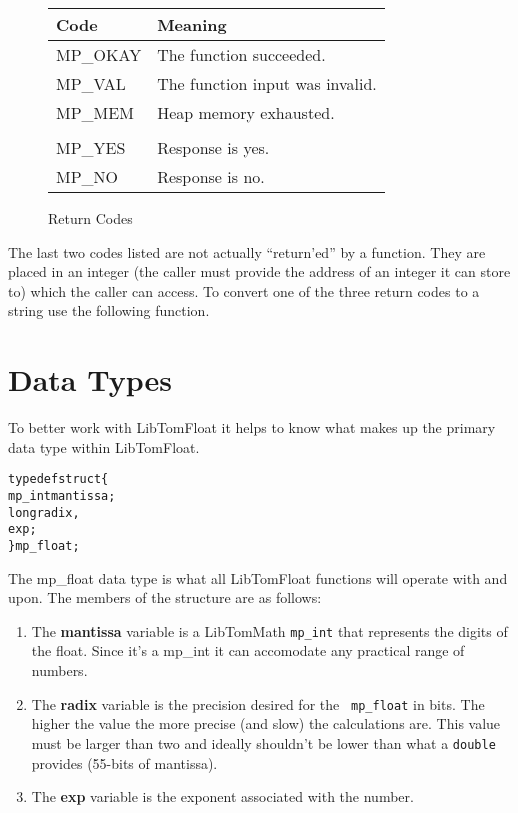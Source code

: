 \documentclass[a4paper]{book}
\theoremstyle{definition}
\theoremstyle{remark}
\begin{document}
\begin{figure}[here!]
\begin{center}
\begin{small}
\begin{tabular}{|l|l|}
\hline \textbf{Code} & \textbf{Meaning} \\
\hline MP\_OKAY & The function succeeded. \\
\hline MP\_VAL  & The function input was invalid. \\
\hline MP\_MEM  & Heap memory exhausted. \\
\hline &\\
\hline MP\_YES  & Response is yes. \\
\hline MP\_NO   & Response is no. \\
\hline
\end{tabular}
\end{small}
\end{center}
\caption{Return Codes}
\end{figure}

The last two codes listed are not actually ``return'ed'' by a function.  They are placed in an integer (the caller must provide the address of an integer it can store to) which the caller can access.  To convert one of the three return codes to a string use the following function.

\section{Data Types}

To better work with LibTomFloat it helps to know what makes up the primary data type within LibTomFloat.

\begin{alltt}
typedef struct \{
     mp_int mantissa;
     long   radix,
            exp;
\} mp_float;
\end{alltt}

The mp\_float data type is what all LibTomFloat functions will operate with and upon.  The members of the structure are as follows:

\begin{enumerate}
   \item The \textbf{mantissa} variable is a LibTomMath {\texttt{mp\_int}} that represents the digits of the float. Since it's a mp\_int it can accomodate any practical range of numbers.
   \item The \textbf{radix} variable is the precision desired for the {\texttt{ mp\_float}} in bits. The higher the value the more precise (and slow) the calculations are.  This value must be larger than two and ideally shouldn't be lower than what a {\texttt{double}} provides (55-bits of mantissa).
   \item The \textbf{exp} variable is the exponent associated with the number.  
\end{enumerate}
\end{document}

